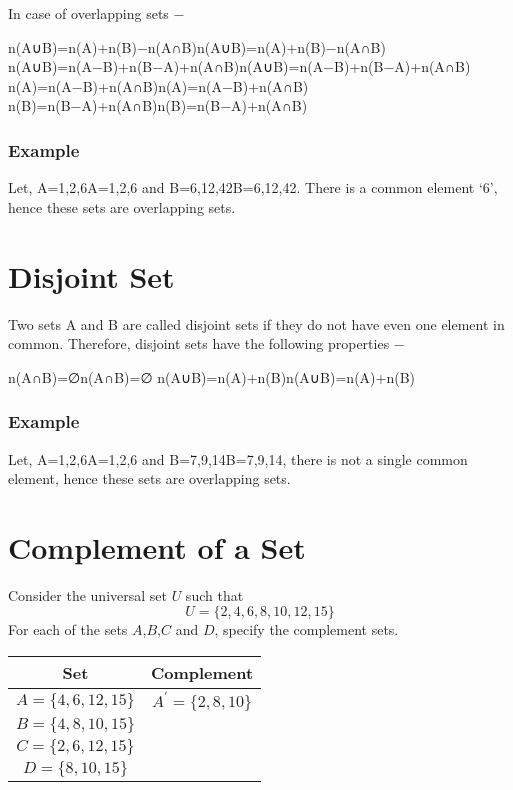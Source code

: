 \documentclass[12pt]{article}
\begin{document}
In case of overlapping sets −

n(A∪B)=n(A)+n(B)−n(A∩B)n(A∪B)=n(A)+n(B)−n(A∩B)
n(A∪B)=n(A−B)+n(B−A)+n(A∩B)n(A∪B)=n(A−B)+n(B−A)+n(A∩B)
n(A)=n(A−B)+n(A∩B)n(A)=n(A−B)+n(A∩B)
n(B)=n(B−A)+n(A∩B)n(B)=n(B−A)+n(A∩B)
\subsubsection{Example} Let, A={1,2,6}A={1,2,6} and B={6,12,42}B={6,12,42}. There is a common element ‘6’, hence these sets are overlapping sets.

\section{Disjoint Set}
Two sets A and B are called disjoint sets if they do not have even one element in common. Therefore, disjoint sets have the following properties −

n(A∩B)=∅n(A∩B)=∅
n(A∪B)=n(A)+n(B)n(A∪B)=n(A)+n(B)
\subsubsection{Example} Let, A={1,2,6}A={1,2,6} and B={7,9,14}B={7,9,14}, there is not a single common element, hence these sets are overlapping sets.



\section*{Complement of a Set}
Consider the universal set $U$ such that
\[U=\{2,4,6,8,10,12,15\} \]
For each of the sets $A$,$B$,$C$ and $D$, specify the complement sets.
{
	\LARGE
	\begin{center}
		\begin{tabular}{|c|c|}
			\hline
			Set &\phantom{sp} Complement \phantom{sp}\\
			\hline \phantom{sp} $A=\{4,6,12,15\}$ \phantom{sp} &
			$A^{\prime}=\{2,8,10\}$ \\ \hline $B=\{4,8,10,15\}$ & \\ \hline
			$C=\{2,6,12,15\}$ & \\ \hline $D=\{8,10,15\}$ & \\ \hline
			
		\end{tabular}
	\end{center}
}
\end{document}
